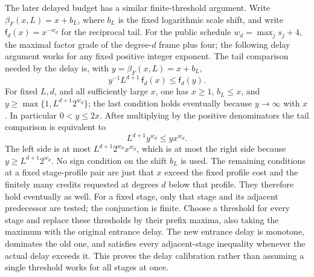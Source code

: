 The later delayed budget has a similar finite-threshold argument. Write
$\beta_F(x,L)=x+b_L$, where $b_L$ is the fixed logarithmic scale shift,
and write $\mathsf f_d(x)=x^{-w_d}$ for the reciprocal tail. For the
public schedule $w_d=\max_js_j+4$, the maximal factor grade of the
degree-$d$ frame plus four; the following delay argument works for any
fixed positive integer exponent. The tail
comparison needed by the delay is, with $y=\beta_F(x,L)=x+b_L$,
\[
       y^{-1}L^{d+1}\,\mathsf f_d(x)\leq\mathsf f_d(y).
\]
For fixed $L,d$, and all sufficiently large $x$, one has $x\geq1$,
$b_L\leq x$, and $y\geq\max\{1,L^{d+1}2^{w_d}\}$; the last condition
holds eventually because $y\to\infty$ with $x$. In particular
$0<y\leq2x$. After multiplying by the positive denominators the tail
comparison is equivalent to
\[
       L^{d+1} y^{w_d}\leq yx^{w_d}.
\]
The left side is at most $L^{d+1}2^{w_d}x^{w_d}$, which is at most the
right side because $y\geq L^{d+1}2^{w_d}$. No sign condition on the
shift $b_L$ is used. The remaining conditions at a fixed
stage-profile pair are just that $x$ exceed the fixed profile cost and
the finitely many credits requested at degrees $d$ below that profile.
They therefore hold eventually as well. For a fixed stage, only that
stage and its adjacent predecessor are tested; the conjunction is finite.
Choose a threshold for every stage and replace these thresholds by their
prefix maxima, also taking the maximum with the original entrance delay.
The new entrance delay is monotone, dominates the old one, and satisfies
every adjacent-stage inequality whenever the actual delay exceeds it.
This proves the delay calibration rather than assuming a single threshold
works for all stages at once.

